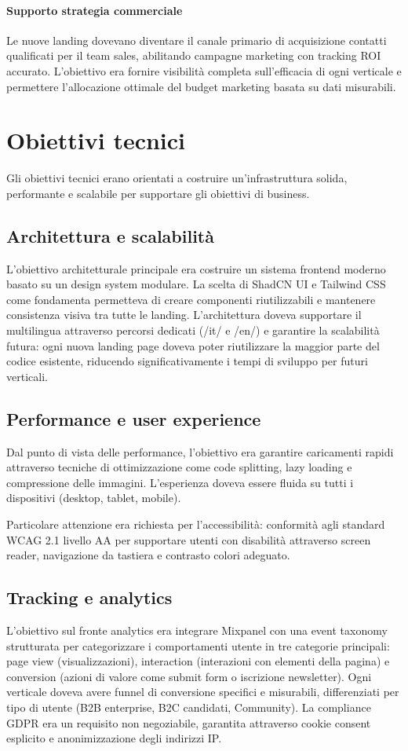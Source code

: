\paragraph{Supporto strategia commerciale}
Le nuove landing dovevano diventare il canale primario di acquisizione 
contatti qualificati per il team sales, abilitando campagne marketing con 
tracking ROI accurato. L'obiettivo era fornire visibilità completa 
sull'efficacia di ogni verticale e permettere l'allocazione ottimale del 
budget marketing basata su dati misurabili.

\section{Obiettivi tecnici}
Gli obiettivi tecnici erano orientati a costruire un'infrastruttura 
solida, performante e scalabile per supportare gli obiettivi di business.

\subsection{Architettura e scalabilità}
L'obiettivo architetturale principale era costruire un sistema frontend 
moderno basato su un design system modulare. La scelta di ShadCN UI e 
Tailwind CSS come fondamenta permetteva di creare componenti riutilizzabili 
e mantenere consistenza visiva tra tutte le landing. L'architettura doveva 
supportare il multilingua attraverso percorsi dedicati (/it/ e /en/) e 
garantire la scalabilità futura: ogni nuova landing page doveva poter 
riutilizzare la maggior parte del codice esistente, riducendo 
significativamente i tempi di sviluppo per futuri verticali.

\subsection{Performance e user experience}
Dal punto di vista delle performance, l'obiettivo era garantire 
caricamenti rapidi attraverso tecniche di ottimizzazione come code 
splitting, lazy loading e compressione delle immagini. L'esperienza 
doveva essere fluida su tutti i dispositivi (desktop, tablet, mobile). 

Particolare attenzione era richiesta per l'accessibilità: conformità 
agli standard WCAG 2.1 livello AA per supportare utenti con disabilità 
attraverso screen reader, navigazione da tastiera e contrasto colori 
adeguato.

\subsection{Tracking e analytics}
L'obiettivo sul fronte analytics era integrare Mixpanel con una event 
taxonomy strutturata per categorizzare i comportamenti utente in tre 
categorie principali: page view (visualizzazioni), interaction 
(interazioni con elementi della pagina) e conversion (azioni di valore 
come submit form o iscrizione newsletter). Ogni verticale doveva avere 
funnel di conversione specifici e misurabili, differenziati per tipo di 
utente (B2B enterprise, B2C candidati, Community). La compliance GDPR 
era un requisito non negoziabile, garantita attraverso cookie consent 
esplicito e anonimizzazione degli indirizzi IP.